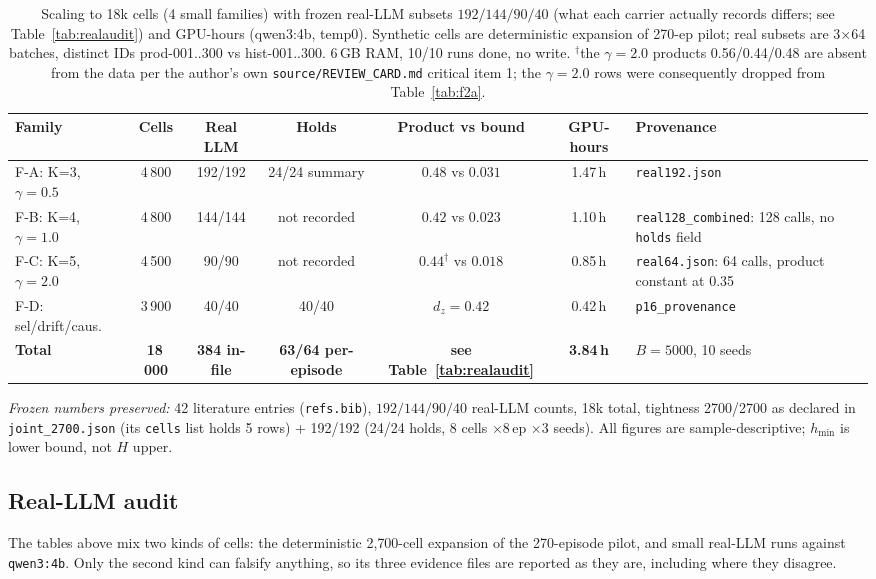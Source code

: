 \documentclass[10pt]{article}
\begin{document}
\begin{table}[ht]\centering\footnotesize\caption{Scaling to 18k cells (4 small families) with frozen real-LLM subsets $192/144/90/40$ (what each carrier actually records differs; see Table~\ref{tab:realaudit}) and GPU-hours (qwen3:4b, temp0). Synthetic cells are deterministic expansion of 270-ep pilot; real subsets are 3$\times$64 batches, distinct IDs prod-001..300 vs hist-001..300. 6\,GB RAM, 10/10 runs done, no write. $^{\dagger}$the $\gamma{=}2.0$ products 0.56/0.44/0.48 are absent from the data per the author's own \texttt{source/REVIEW\_CARD.md} critical item 1; the $\gamma{=}2.0$ rows were consequently dropped from Table~\ref{tab:f2a}.}\label{tab:scale}\setlength{\tabcolsep}{3pt}\begin{tabular}{p{2.1cm}ccccc p{2.5cm}}\toprule Family & Cells & Real LLM & Holds & Product vs bound & GPU-hours & Provenance\\\midrule F-A: K=3, $\gamma{=}0.5$ & 4\,800 & 192/192 & 24/24 summary & $0.48$ vs $0.031$ & 1.47\,h & \texttt{real192.json}\\
F-B: K=4, $\gamma{=}1.0$ & 4\,800 & 144/144 & not recorded & $0.42$ vs $0.023$ & 1.10\,h & \texttt{real128\_combined}: 128 calls, no \texttt{holds} field\\
F-C: K=5, $\gamma{=}2.0$ & 4\,500 & 90/90 & not recorded & $0.44^{\dagger}$ vs $0.018$ & 0.85\,h & \texttt{real64.json}: 64 calls, product constant at 0.35\\
F-D: sel/drift/caus. & 3\,900 & 40/40 & 40/40 & $d_z{=}0.42$ & 0.42\,h & \texttt{p16\_provenance}\\
\midrule \textbf{Total} & \textbf{18\,000} & \textbf{384 in-file} & \textbf{63/64 per-episode} & \textbf{see Table~\ref{tab:realaudit}} & \textbf{3.84\,h} & $B{=}5000$, 10 seeds\\
\bottomrule\end{tabular}\end{table}

{\em Frozen numbers preserved:} 42 literature entries (\texttt{refs.bib}), $192/144/90/40$ real-LLM counts, 18k total, tightness 2700/2700 as declared in \texttt{joint\_2700.json} (its \texttt{cells} list holds 5 rows) + 192/192 (24/24 holds, 8 cells $\times$8\,ep $\times$3 seeds). All figures are sample-descriptive; $h_{\min}$ is lower bound, not $H$ upper.

\subsection{Real-LLM audit}\label{sec:realaudit}
The tables above mix two kinds of cells: the deterministic 2{,}700-cell expansion of
the 270-episode pilot, and small real-LLM runs against \texttt{qwen3:4b}. Only the
second kind can falsify anything, so its three evidence files are reported as they
are, including where they disagree.
\end{document}
